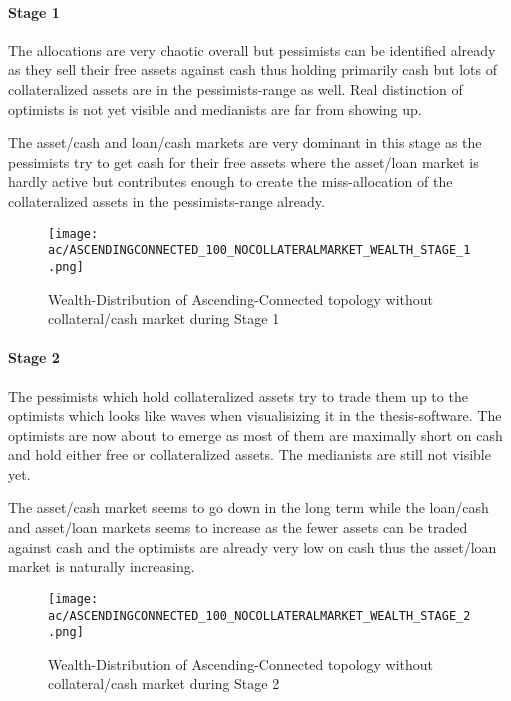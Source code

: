 \documentclass[Bachelorarbeit.tex]{subfiles}
\begin{document}
\paragraph{Stage 1}
The allocations are very chaotic overall but pessimists can be identified already as they sell their free assets against cash thus holding primarily cash but lots of collateralized assets are in the pessimists-range as well. Real distinction of optimists is not yet visible and medianists are far from showing up.

\medskip

The asset/cash and loan/cash markets are very dominant in this stage as the pessimists try to get cash for their free assets where the asset/loan market is hardly active but contributes enough to create the miss-allocation of the collateralized assets in the pessimists-range already.

\begin{figure}[H]
	\centering
  \texttt{[image: ac/ASCENDINGCONNECTED\_100\_NOCOLLATERALMARKET\_WEALTH\_STAGE\_1.png]}
  	\caption{Wealth-Distribution of Ascending-Connected topology without collateral/cash market during Stage 1}
	\label{fig:markets_ASCENDINGCONNECTED_100_NOCOLLATERALMARKET_WEALTH_STAGE_1}
\end{figure}

\paragraph{Stage 2}
The pessimists which hold collateralized assets try to trade them up to the optimists which looks like waves when visualisizing it in the thesis-software. The optimists are now about to emerge as most of them are maximally short on cash and hold either free or collateralized assets. The medianists are still not visible yet.

\medskip
		
The asset/cash market seems to go down in the long term while the loan/cash and asset/loan markets seems to increase as the fewer assets can be traded against cash and the optimists are already very low on cash thus the asset/loan market is naturally increasing.
		
\begin{figure}[H]
	\centering
  \texttt{[image: ac/ASCENDINGCONNECTED\_100\_NOCOLLATERALMARKET\_WEALTH\_STAGE\_2.png]}
  	\caption{Wealth-Distribution of Ascending-Connected topology without collateral/cash market during Stage 2}
	\label{fig:markets_ASCENDINGCONNECTED_100_NOCOLLATERALMARKET_WEALTH_STAGE_2}
\end{figure}
		
\end{document}
